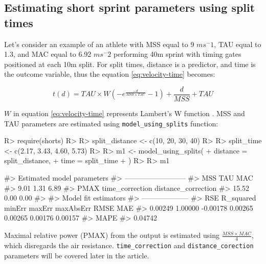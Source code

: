 \documentclass[
]{jss}
\begin{document}
\hypertarget{estimating-short-sprint-parameters-using-split-times}{%
\subsection{Estimating short sprint parameters using split times}\label{estimating-short-sprint-parameters-using-split-times}}

Let's consider an example of an athlete with MSS equal to 9 \(ms^-1\), TAU equal to 1.3, and MAC equal to 6.92 \(ms^-2\) performing 40m sprint with timing gates positioned at each 10m split. For split times, distance is a predictor, and time is the outcome variable, thus the equation \eqref{eq:velocity-time} becomes:

\begin{equation}
  t(d) = TAU \times W(-e^{\frac{-d}{MSS \times TAU}} - 1) + \frac{d}{MSS} + TAU \label{eq:time-distance}
\end{equation}

\(W\) in equation \eqref{eq:velocity-time} represents Lambert's W function \citep{R-LambertW}. MSS and TAU parameters are estimated using \texttt{model\_using\_splits} function:

\begin{CodeChunk}
\begin{CodeInput}
R> require(shorts)
R> 
R> split_distance <- c(10, 20, 30, 40)
R> 
R> split_time <- c(2.17, 3.43, 4.60, 5.73)
R> 
R> m1 <- model_using_splits(
+   distance = split_distance,
+   time = split_time
+ )
R> 
R> m1
\end{CodeInput}
\begin{CodeOutput}
#> Estimated model parameters
#> --------------------------
#>                 MSS                 TAU                 MAC 
#>                9.01                1.31                6.89 
#>                PMAX     time_correction distance_correction 
#>               15.52                0.00                0.00 
#> 
#> Model fit estimators
#> --------------------
#>       RSE R_squared    minErr    maxErr maxAbsErr      RMSE       MAE 
#>   0.00249   1.00000  -0.00178   0.00265   0.00265   0.00176   0.00157 
#>      MAPE 
#>   0.04742
\end{CodeOutput}
\end{CodeChunk}

Maximal relative power (PMAX) from the output is estimated using \(\frac{MSS \times MAC}{4}\), which disregards the air resistance. \texttt{time\_correction} and \texttt{distance\_corection} parameters will be covered later in the article.
\end{document}
